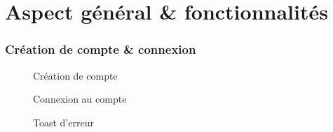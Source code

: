 \documentclass{beamer}
\begin{document}
\section{Aspect général \& fonctionnalités}
\begin{frame}
	\frametitle{Création de compte \& connexion}
	\begin{multicols}{2}
		\begin{figure}
			\centering
			\caption{Création de compte}
		\end{figure}

		\columnbreak
		
		\begin{figure}
			\captionsetup{justification=raggedleft,singlelinecheck = false}
			\raggedleft
			\caption{Connexion au compte}
		\end{figure}
		\captionsetup{justification=raggedright,singlelinecheck = false}
		\begin{figure}
			\raggedright
			\caption{Toast d'erreur}
		\end{figure}
	\end{multicols}
\end{frame}
\end{document}
